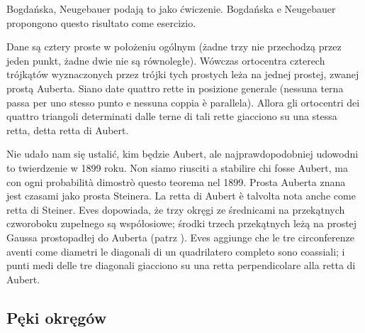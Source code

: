 Bogdańska, Neugebauer \cite[s. 71]{neugebauer_2018} podają to jako ćwiczenie. %
Bogdańska e Neugebauer \cite[p. 71]{neugebauer_2018} propongono questo risultato come esercizio. %

\begin{theorem}
[Auberta] %
[di Aubert] %
	Dane są cztery proste w położeniu ogólnym (żadne trzy nie przechodzą przez jeden punkt, żadne dwie nie są równoległe). %
	Wówczas ortocentra czterech trójkątów wyznaczonych przez trójki tych prostych leża na jednej prostej, zwanej prostą Auberta. %
	Siano date quattro rette in posizione generale (nessuna terna passa per uno stesso punto e nessuna coppia è parallela). %
	Allora gli ortocentri dei quattro triangoli determinati dalle terne di tali rette giacciono su una stessa retta, detta retta di Aubert. %
\end{theorem}

Nie udało nam się ustalić, kim będzie Aubert, ale najprawdopodobniej udowodni to twierdzenie w 1899 roku. %
Non siamo riusciti a stabilire chi fosse Aubert, ma con ogni probabilità dimostrò questo teorema nel 1899. %
%
Prosta Auberta znana jest czasami jako prosta Steinera. %
La retta di Aubert è talvolta nota anche come retta di Steiner. %
Eves \cite[s. 95]{eves1_1972} dopowiada, że trzy okręgi ze średnicami na przekątnych czworoboku zupełnego są współosiowe; środki trzech przekątnych leżą na prostej Gaussa prostopadłej do Auberta (patrz \cite[s. 109]{neugebauer_2018}). %
Eves \cite[p. 95]{eves1_1972} aggiunge che le tre circonferenze aventi come diametri le diagonali di un quadrilatero completo sono coassiali; i punti medi delle tre diagonali giacciono su una retta perpendicolare alla retta di Aubert. %


\subsection{Pęki okręgów} %
